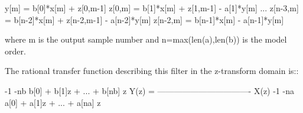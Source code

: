 \begin{DoxyVerb}
     y[m] = b[0]*x[m] + z[0,m-1]
     z[0,m] = b[1]*x[m] + z[1,m-1] - a[1]*y[m]
     ...
     z[n-3,m] = b[n-2]*x[m] + z[n-2,m-1] - a[n-2]*y[m]
     z[n-2,m] = b[n-1]*x[m] - a[n-1]*y[m]

where m is the output sample number and n=max(len(a),len(b)) is the
model order.

The rational transfer function describing this filter in the
z-transform domain is::

                         -1               -nb
             b[0] + b[1]z  + ... + b[nb] z
     Y(z) = ---------------------------------- X(z)
                         -1               -na
             a[0] + a[1]z  + ... + a[na] z\end{DoxyVerb}
 \hypertarget{namespacescipy_1_1signal_1_1signaltools_afd0e036099684901ab60fc54f34f20ea}{}
